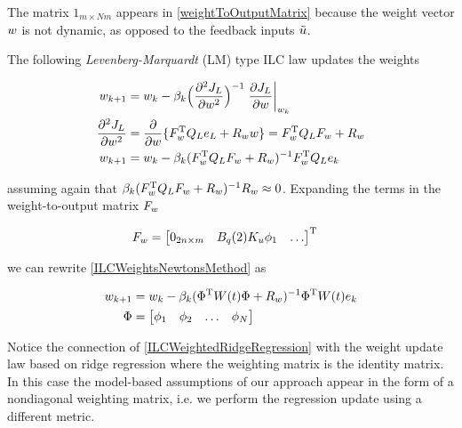 The matrix $1_{m\times Nm}$ appears in \eqref{weightToOutputMatrix} because the weight vector $w$ is not dynamic, as opposed to the feedback inputs $\tilde{u}$.


The following \emph{Levenberg-Marquardt} (LM) type ILC law updates the weights

\begin{equation}
\begin{aligned}
w_{k+1} &= w_k - \beta_k\Big(\frac{\partial^{2}J_L}{\partial w^{2}}\Big)^{-1}\left.\frac{\partial{J_L}}{\partial{w}}\right|_{w_k} \\
\frac{\partial^{2}J_L}{\partial w^{2}} &= \frac{\partial}{\partial w}\{F_{w}^{\mathrm{T}}Q_Le_L + R_{w}w\} = F_{w}^{\mathrm{T}}Q_LF_{w} + R_{w} \\
w_{k+1} &= w_k - \beta_k(F_{w}^{\mathrm{T}}Q_LF_{w} + R_{w})^{-1}F_{w}^{\mathrm{T}}Q_Le_k
\end{aligned}
\label{ILCWeightsNewtonsMethod}
\end{equation}

assuming again that $\beta_k(F_{w}^{\mathrm{T}}Q_LF_{w} + R_{w})^{-1}R_{w} \approx 0$. Expanding the terms in the weight-to-output matrix $F_{w}$

\begin{equation}
\begin{aligned}
F_{w} &= \begin{bmatrix}
  0_{2n \times m} & B_{q}(2)K_{u}\phi_{1} & \ldots
 \end{bmatrix}^{\mathrm{T}}
\end{aligned}
\label{weightToOutputMatrixExpanded}
\end{equation}

we can rewrite \eqref{ILCWeightsNewtonsMethod} as

\begin{equation}
\begin{aligned}
w_{k+1} &= w_k - \beta_k(\Phi^{\mathrm{T}}W(t)\Phi + R_{w})^{-1}\Phi^{\mathrm{T}}W(t)e_k \\
\Phi &= \begin{bmatrix}
  \phi_1 & \phi_2 & \ldots & \phi_N
 \end{bmatrix}
\end{aligned}
\label{ILCWeightedRidgeRegression}
\end{equation}

Notice the connection of \eqref{ILCWeightedRidgeRegression} with the weight update law based on ridge regression where the weighting matrix is the identity matrix. In this case the model-based assumptions of our approach appear in the form of a nondiagonal weighting matrix, i.e. we perform the regression update using a different metric.
